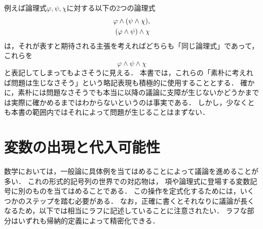 \begin{Note}
	例えば論理式\(\varphi, \psi, \chi\)に対する以下の2つの論理式
	\begin{align*}
		\varphi \land \paren{\psi \land \chi}, \\
		\paren{\varphi \land \psi} \land \chi
	\end{align*}
	は，それが表すと期待される主張を考えればどちらも「同じ論理式」であって，これらを
	\[
		\varphi \land \psi \land \chi
	\]
	と表記してしまってもよさそうに見える．
	本書では，これらの「素朴に考えれば問題は生じなさそう」という略記表現も積極的に使用することとする．
	確かに，素朴には問題なさそうでも本当に以降の議論に支障が生じないかどうかまでは実際に確かめるまではわからないというのは事実である．
	しかし，少なくとも本書の範囲内ではそれによって問題が生じることはまずない．
\end{Note}



\section{変数の出現と代入可能性} \label{sec:substitution}

数学においては，一般論に具体例を当てはめることによって議論を進めることが多い．
これの形式的記号列の世界での対応物は，
項や論理式に登場する変数記号に別のものを当てはめることである．
この操作を定式化するためには，いくつかのステップを踏む必要がある．
なお，正確に書くとそれなりに議論が長くなるため，以下では相当にラフに記述していることに注意されたい．
ラフな部分はいずれも帰納的定義によって精密化できる．


